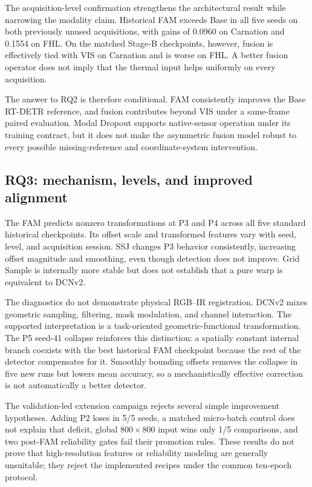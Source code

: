 The acquisition-level confirmation strengthens the architectural result while
narrowing the modality claim. Historical FAM exceeds Base in all five
seeds on both previously unused acquisitions, with gains of 0.0960 on
Carnation and 0.1554 on FHL. On the matched Stage-B checkpoints, however,
fusion is effectively tied with VIS on Carnation and is worse on FHL. A better
fusion operator does not imply that the thermal input helps uniformly on every
acquisition.

The answer to RQ2 is therefore conditional. FAM consistently improves the
Base RT-DETR reference, and fusion contributes beyond VIS under a
same-frame paired evaluation. Modal Dropout supports native-sensor operation
under its training contract, but it does not make the asymmetric fusion model
robust to every possible missing-reference and coordinate-system intervention.

\subsection{RQ3: mechanism, levels, and improved alignment}

The FAM predicts nonzero transformations at P3 and P4 across all five standard
historical checkpoints. Its offset scale and transformed features vary with
seed, level, and acquisition session. SSJ changes P3 behavior consistently,
increasing offset magnitude and smoothing, even though detection does not
improve. Grid Sample is internally more stable but does not establish that a
pure warp is equivalent to DCNv2.

The diagnostics do not demonstrate physical RGB--IR registration. DCNv2 mixes
geometric sampling, filtering, mask modulation, and channel interaction. The
supported interpretation is a task-oriented geometric-functional
transformation. The P5 seed-41 collapse reinforces this distinction: a
spatially constant internal branch coexists with the best historical FAM
checkpoint because the rest of the detector compensates for it. Smoothly
bounding offsets removes the collapse in five new runs but lowers mean
accuracy, so a mechanistically effective correction is not automatically a
better detector.

The validation-led extension campaign rejects several simple improvement
hypotheses. Adding P2 loses in 5/5 seeds, a matched micro-batch control does not
explain that deficit, global \(800\times800\) input wins only 1/5 comparisons,
and two post-FAM reliability gates fail their promotion rules. These results do
not prove that high-resolution features or reliability modeling are generally
unsuitable; they reject the implemented recipes under the common ten-epoch
protocol.

